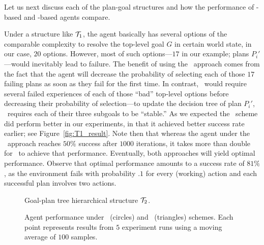 

Let us next discuss each of the plan-goal structures and how the performance of
\BUL-based and \CL-based agents compare.


Under a structure like $\T_1$, the agent basically has several options of the
comparable complexity to resolve the top-level goal $G$ in certain world state,
in our case, $20$ options. However, most of such options---$17$ in our example;
plans $P_i'$---would inevitably lead to failure.
The benefit of using the \CL\ approach comes from the fact that the agent will
decrease the probability of selecting each of those $17$ failing plans as soon as
they fail for the first time. In contrast, \BUL\ would require several failed
experiences of each of those ``bad'' top-level options before decreasing their
probability of selection---to update the decision tree of plan $P_i'$, \BUL\
requires each of their three subgoals to be ``stable.''
As we expected the \CL\ scheme did perform better in our experiments, in that it
achieved better success rate earlier; see Figure~\ref{fig:T1_result}.
Note then that whereas the agent under the \CL\ approach reaches $50\%$ success
after $1000$ iterations, it takes more than double for \BUL\ to achieve that
performance.
Eventually, both approaches will yield optimal performance. Observe that optimal
performance amounts to a success rate of $81\%$, as the environment fails with
probability $.1$ for every (working) action and each successful plan involves
two actions.


\begin{figure}[t]
\begin{center}

\end{center}
\caption{Goal-plan tree hierarchical structure $\T_2$.}
\label{fig:T2}
\end{figure}


\begin{figure*}[t]
\begin{center}
\subfigure[Structure $\T_1$]{\label{fig:T1_result}

}
\qquad
\subfigure[Structure $\T_2$]{\label{fig:T2_result}

}
\qquad
\subfigure[Structure $\T_3$]{\label{fig:T3_result}

}
\caption{Agent performance under \BUL\ (circles) and \CL\ (triangles) schemes.
Each point represents results from $5$ experiment runs using a moving average of $100$ samples.}
\end{center}
\end{figure*}


